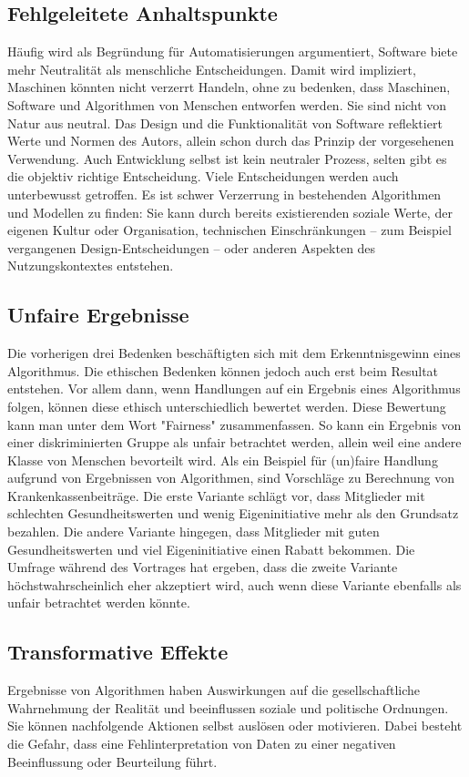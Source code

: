 \subsection{Fehlgeleitete Anhaltspunkte}
Häufig wird als Begründung für Automatisierungen argumentiert, Software biete mehr Neutralität als menschliche Entscheidungen. Damit wird impliziert, Maschinen könnten nicht verzerrt Handeln, ohne zu bedenken, dass Maschinen, Software und Algorithmen von Menschen entworfen werden. Sie sind nicht von Natur aus neutral. Das Design und die Funktionalität von Software reflektiert Werte und Normen des Autors, allein schon durch das Prinzip der vorgesehenen Verwendung. Auch Entwicklung selbst ist kein neutraler Prozess, selten gibt es die objektiv richtige Entscheidung. Viele Entscheidungen werden auch unterbewusst getroffen. Es ist schwer Verzerrung in bestehenden Algorithmen und Modellen zu finden: Sie kann durch bereits existierenden soziale Werte, der eigenen Kultur oder Organisation, technischen Einschränkungen -- zum Beispiel vergangenen Design-Entscheidungen -- oder anderen Aspekten des Nutzungskontextes entstehen.

\subsection{Unfaire Ergebnisse}

Die vorherigen drei Bedenken beschäftigten sich mit dem Erkenntnisgewinn eines Algorithmus. Die ethischen Bedenken können jedoch auch erst beim Resultat entstehen. Vor allem dann, wenn Handlungen auf ein Ergebnis eines Algorithmus folgen, können diese ethisch unterschiedlich bewertet werden. Diese Bewertung kann man unter dem Wort "Fairness" zusammenfassen. 
So kann ein Ergebnis von einer diskriminierten Gruppe als unfair betrachtet werden, allein weil eine andere Klasse von Menschen bevorteilt wird. 
Als ein Beispiel für (un)faire Handlung aufgrund von Ergebnissen von Algorithmen, sind Vorschläge zu Berechnung von Krankenkassenbeiträge. Die erste Variante schlägt vor, dass Mitglieder mit schlechten Gesundheitswerten und wenig Eigeninitiative mehr als den Grundsatz bezahlen. Die andere Variante hingegen, dass Mitglieder mit guten Gesundheitswerten und viel Eigeninitiative einen Rabatt bekommen. 
Die Umfrage während des Vortrages hat ergeben, dass die zweite Variante höchstwahrscheinlich eher akzeptiert wird, auch wenn diese Variante ebenfalls als unfair betrachtet werden könnte.


\subsection{Transformative Effekte}
Ergebnisse von Algorithmen haben Auswirkungen auf die gesellschaftliche Wahrnehmung der Realität und beeinflussen soziale und politische Ordnungen. Sie können nachfolgende Aktionen selbst auslösen oder motivieren. Dabei besteht die Gefahr, dass eine Fehlinterpretation von Daten zu einer negativen Beeinflussung oder Beurteilung führt.


